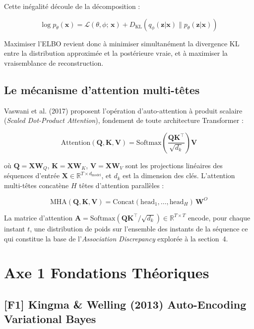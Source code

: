 \documentclass[12pt,a4paper]{article}
\begin{document}
Cette inégalité découle de la décomposition :

$$\log p_\theta(\mathbf{x}) = \mathcal{L}(\theta,\phi;\,\mathbf{x}) + D_{\mathrm{KL}}(q_\phi(\mathbf{z}|\mathbf{x}) \| p_\theta(\mathbf{z}|\mathbf{x}))$$

Maximiser l'ELBO revient donc à minimiser simultanément la divergence KL entre la distribution approximée et la postérieure vraie, et à maximiser la vraisemblance de reconstruction.

\subsection{Le mécanisme d'attention multi-têtes}

Vaswani et al. (2017) proposent l'opération d'auto-attention à produit scalaire (\textit{Scaled Dot-Product Attention}), fondement de toute architecture Transformer :

$$\mathrm{Attention}(\mathbf{Q}, \mathbf{K}, \mathbf{V}) = \mathrm{Softmax}\!\left(\frac{\mathbf{Q}\mathbf{K}^\top}{\sqrt{d_k}}\right)\mathbf{V}$$

où $\mathbf{Q} = \mathbf{X}\mathbf{W}_Q$, $\mathbf{K} = \mathbf{X}\mathbf{W}_K$, $\mathbf{V} = \mathbf{X}\mathbf{W}_V$ sont les projections linéaires des séquences d'entrée $\mathbf{X} \in \mathbb{R}^{T \times d_{\mathrm{model}}}$, et $d_k$ est la dimension des clés. L'attention multi-têtes concatène $H$ têtes d'attention parallèles :

$$\mathrm{MHA}(\mathbf{Q},\mathbf{K},\mathbf{V}) = \mathrm{Concat}(\mathrm{head}_1, \ldots, \mathrm{head}_H)\,\mathbf{W}^O$$

La matrice d'attention $\mathbf{A} = \mathrm{Softmax}(\mathbf{Q}\mathbf{K}^\top/\sqrt{d_k}) \in \mathbb{R}^{T\times T}$ encode, pour chaque instant $t$, une distribution de poids sur l'ensemble des instants de la séquence  ce qui constitue la base de l'\textit{Association Discrepancy} explorée à la section~4.

\section{Axe 1 Fondations Théoriques}

\subsection{[F1] Kingma \& Welling (2013)  Auto-Encoding Variational Bayes}
\end{document}
